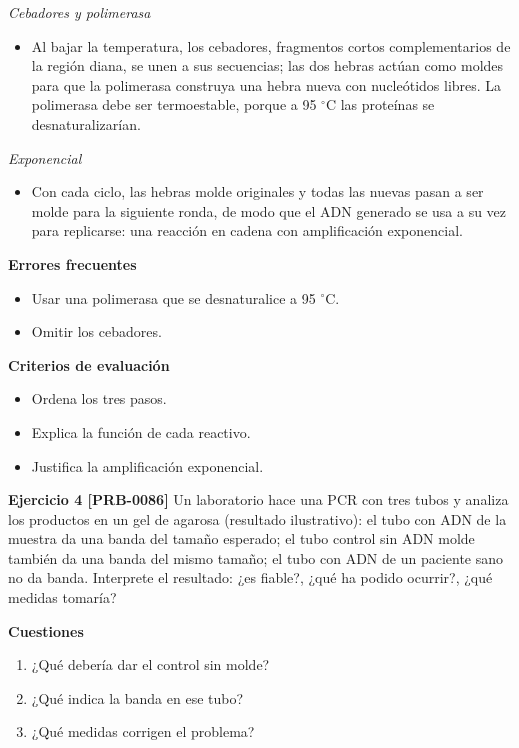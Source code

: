\documentclass{book}
\begin{document}
\noindent\textit{Cebadores y polimerasa}
\begin{itemize}
\item Al bajar la temperatura, los cebadores, fragmentos cortos complementarios de la región diana, se unen a sus secuencias; las dos hebras actúan como moldes para que la polimerasa construya una hebra nueva con nucleótidos libres. La polimerasa debe ser termoestable, porque a 95 \(^{\circ}\)C las proteínas se desnaturalizarían.
\end{itemize}

\noindent\textit{Exponencial}
\begin{itemize}
\item Con cada ciclo, las hebras molde originales y todas las nuevas pasan a ser molde para la siguiente ronda, de modo que el ADN generado se usa a su vez para replicarse: una reacción en cadena con amplificación exponencial.
\end{itemize}

\noindent\textbf{Errores frecuentes}
\begin{itemize}
\item Usar una polimerasa que se desnaturalice a 95 \(^{\circ}\)C.
\item Omitir los cebadores.
\end{itemize}

\noindent\textbf{Criterios de evaluación}
\begin{itemize}
\item Ordena los tres pasos.
\item Explica la función de cada reactivo.
\item Justifica la amplificación exponencial.
\end{itemize}

\noindent\textbf{Ejercicio 4 [PRB-0086]}
Un laboratorio hace una PCR con tres tubos y analiza los productos en un gel de agarosa (resultado ilustrativo): el tubo con ADN de la muestra da una banda del tamaño esperado; el tubo control sin ADN molde también da una banda del mismo tamaño; el tubo con ADN de un paciente sano no da banda. Interprete el resultado: ¿es fiable?, ¿qué ha podido ocurrir?, ¿qué medidas tomaría?


\noindent\textbf{Cuestiones}
\begin{enumerate}
\item ¿Qué debería dar el control sin molde?
\item ¿Qué indica la banda en ese tubo?
\item ¿Qué medidas corrigen el problema?
\end{enumerate}
\end{document}
